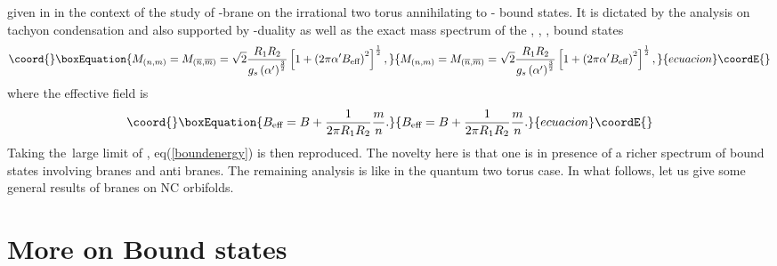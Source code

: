 \documentclass[a4paper,12pt]{article}
\begin{document}
given in \cite{g} in the context of the study of \coordHE{}-brane on the
irrational two torus annihilating to \coordHE{}-\coordHE{} bound states. It is dictated
by the analysis on tachyon condensation and also supported by \coordHE{}-duality as
well as the exact mass spectrum of the \coordHE{}, \coordHE{},
\coordHE{}, \coordHE{} bound states
\begin{equation}\coord{}\boxEquation{
M_{\left( n,m\right) }=M_{\left( \overline{n},\overline{m}\right) }=\sqrt{2}
\frac{R_{1}R_{2}}{g_{s}\left( \alpha ^{\prime }\right) ^{\frac{3}{2}}}\left[
1+\left( 2\pi \alpha ^{\prime }B_{\text{eff}}\right) ^{2}\right] ^{\frac{1}{2
}},
}{
M_{\left( n,m\right) }=M_{\left( \overline{n},\overline{m}\right) }=\sqrt{2}
\frac{R_{1}R_{2}}{g_{s}\left( \alpha ^{\prime }\right) ^{\frac{3}{2}}}\left[
1+\left( 2\pi \alpha ^{\prime }B_{\text{eff}}\right) ^{2}\right] ^{\frac{1}{2
}},
}{ecuacion}\coordE{}\end{equation}
where the effective \coordHE{} field is
\begin{equation}\coord{}\boxEquation{
B_{\text{eff}}=B+\frac{1}{2\pi R_{1}R_{2}}\frac{m}{n}.
}{
B_{\text{eff}}=B+\frac{1}{2\pi R_{1}R_{2}}\frac{m}{n}.
}{ecuacion}\coordE{}\end{equation}
Taking the\ large limit of \coordHE{}, eq(\ref{boundenergy}) is then reproduced. The novelty
here is that one is in presence of a richer spectrum of bound
states involving branes and anti branes. The remaining analysis is
like in the quantum two torus case. In what follows, let us give
some general results of branes on NC orbifolds.

\section{More on Bound states}
\end{document}
